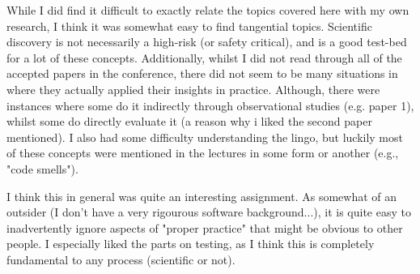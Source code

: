 \documentclass[11pt,compsoc,a4paper]{IEEEtran}
\begin{document}
While I did find it difficult to exactly relate the topics covered here with my own research, I think it was somewhat easy to find tangential topics. Scientific discovery is not necessarily a high-risk (or safety critical), and is a good test-bed for a lot of these concepts. Additionally, whilst I did not read through all of the accepted papers in the conference, there did not seem to be many situations in where they actually applied their insights in practice. Although, there were instances where some do it indirectly through observational studies (e.g. paper 1), whilst some do directly evaluate it (a reason why i liked the second paper mentioned). I also had some difficulty understanding the lingo, but luckily most of these concepts were mentioned in the lectures in some form or another (e.g., "code smells").

I think this in general was quite an interesting assignment. As somewhat of an outsider (I don't have a very rigourous software background...), it is quite easy to inadvertently ignore aspects of "proper practice" that might be obvious to other people.  I especially liked the parts on testing, as I think this is completely fundamental to any process (scientific or not).


\end{document}
